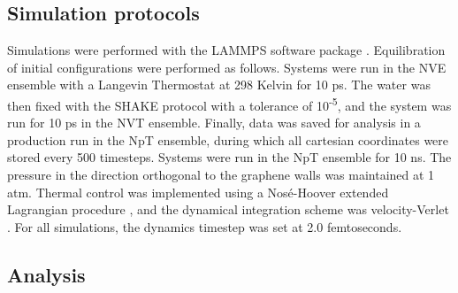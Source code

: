 \documentclass[12pt]{article}
\begin{document}
\subsection*{Simulation protocols}

Simulations were performed with the LAMMPS software package \cite{Plimpton1995}. 
Equilibration of initial configurations were performed as follows. Systems were run in 
the NVE ensemble with a Langevin Thermostat at 298 Kelvin
for 10 ps. The water was then fixed with the SHAKE protocol \cite{Andersen1983} with a tolerance
of 10\textsuperscript{-5}, and the system was run for 10 ps in the NVT ensemble.
Finally, data was saved for analysis in a production run in the NpT ensemble,
during which all cartesian coordinates were stored every 500 timesteps. 
Systems were run in the NpT ensemble for 10 ns. The 
pressure in the direction orthogonal to the graphene walls was maintained at 1 atm.
Thermal control was implemented using a Nos\' e-Hoover extended Lagrangian procedure \cite{Martyna1994},
and the dynamical integration scheme was velocity-Verlet \cite{Swope1982}.
For all simulations, the dynamics timestep was set at 2.0 femtoseconds. 

\subsection*{Analysis}

\clearpage
\end{document}
